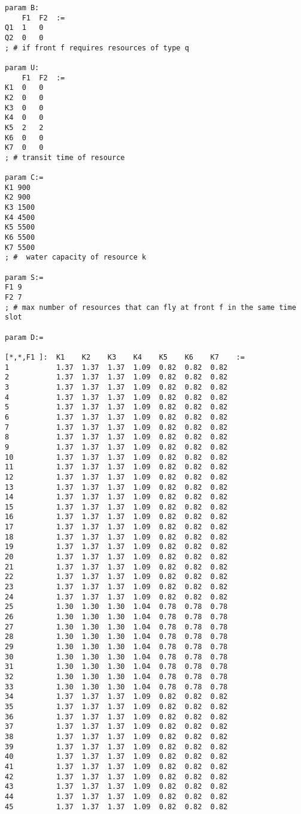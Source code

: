 \begin{lstlisting}
param B:
	F1  F2  :=
Q1	1   0
Q2	0   0
; # if front f requires resources of type q

param U:
	F1  F2  :=
K1	0   0
K2	0   0
K3	0   0
K4	0   0
K5	2   2
K6	0   0
K7	0   0
; # transit time of resource

param C:=
K1 900
K2 900
K3 1500
K4 4500
K5 5500
K6 5500
K7 5500
; #  water capacity of resource k

param S:=
F1 9
F2 7
; # max number of resources that can fly at front f in the same time slot

param D:=

[*,*,F1 ]:  K1    K2    K3    K4    K5    K6    K7    :=
1           1.37  1.37  1.37  1.09  0.82  0.82  0.82
2           1.37  1.37  1.37  1.09  0.82  0.82  0.82
3           1.37  1.37  1.37  1.09  0.82  0.82  0.82
4           1.37  1.37  1.37  1.09  0.82  0.82  0.82
5           1.37  1.37  1.37  1.09  0.82  0.82  0.82
6           1.37  1.37  1.37  1.09  0.82  0.82  0.82
7           1.37  1.37  1.37  1.09  0.82  0.82  0.82
8           1.37  1.37  1.37  1.09  0.82  0.82  0.82
9           1.37  1.37  1.37  1.09  0.82  0.82  0.82
10          1.37  1.37  1.37  1.09  0.82  0.82  0.82
11          1.37  1.37  1.37  1.09  0.82  0.82  0.82
12          1.37  1.37  1.37  1.09  0.82  0.82  0.82
13          1.37  1.37  1.37  1.09  0.82  0.82  0.82
14          1.37  1.37  1.37  1.09  0.82  0.82  0.82
15          1.37  1.37  1.37  1.09  0.82  0.82  0.82
16          1.37  1.37  1.37  1.09  0.82  0.82  0.82
17          1.37  1.37  1.37  1.09  0.82  0.82  0.82
18          1.37  1.37  1.37  1.09  0.82  0.82  0.82
19          1.37  1.37  1.37  1.09  0.82  0.82  0.82
20          1.37  1.37  1.37  1.09  0.82  0.82  0.82
21          1.37  1.37  1.37  1.09  0.82  0.82  0.82
22          1.37  1.37  1.37  1.09  0.82  0.82  0.82
23          1.37  1.37  1.37  1.09  0.82  0.82  0.82
24          1.37  1.37  1.37  1.09  0.82  0.82  0.82
25          1.30  1.30  1.30  1.04  0.78  0.78  0.78
26          1.30  1.30  1.30  1.04  0.78  0.78  0.78
27          1.30  1.30  1.30  1.04  0.78  0.78  0.78
28          1.30  1.30  1.30  1.04  0.78  0.78  0.78
29          1.30  1.30  1.30  1.04  0.78  0.78  0.78
30          1.30  1.30  1.30  1.04  0.78  0.78  0.78
31          1.30  1.30  1.30  1.04  0.78  0.78  0.78
32          1.30  1.30  1.30  1.04  0.78  0.78  0.78
33          1.30  1.30  1.30  1.04  0.78  0.78  0.78
34          1.37  1.37  1.37  1.09  0.82  0.82  0.82
35          1.37  1.37  1.37  1.09  0.82  0.82  0.82
36          1.37  1.37  1.37  1.09  0.82  0.82  0.82
37          1.37  1.37  1.37  1.09  0.82  0.82  0.82
38          1.37  1.37  1.37  1.09  0.82  0.82  0.82
39          1.37  1.37  1.37  1.09  0.82  0.82  0.82
40          1.37  1.37  1.37  1.09  0.82  0.82  0.82
41          1.37  1.37  1.37  1.09  0.82  0.82  0.82
42          1.37  1.37  1.37  1.09  0.82  0.82  0.82
43          1.37  1.37  1.37  1.09  0.82  0.82  0.82
44          1.37  1.37  1.37  1.09  0.82  0.82  0.82
45          1.37  1.37  1.37  1.09  0.82  0.82  0.82


\end{lstlisting}
